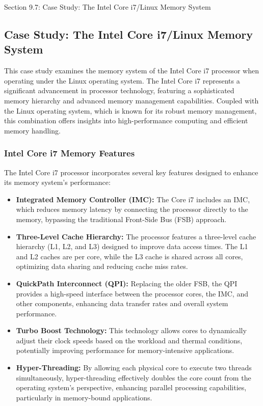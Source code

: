 \begin{notes}{Section 9.7: Case Study: The Intel Core i7/Linux Memory System}
    \subsection*{Case Study: The Intel Core i7/Linux Memory System}

    This case study examines the memory system of the Intel Core i7 processor when operating under the Linux operating system. The Intel Core i7 represents a significant advancement in processor 
    technology, featuring a sophisticated memory hierarchy and advanced memory management capabilities. Coupled with the Linux operating system, which is known for its robust memory management, this 
    combination offers insights into high-performance computing and efficient memory handling. \vspace*{1em}
    
    \subsubsection*{Intel Core i7 Memory Features}
    
    The Intel Core i7 processor incorporates several key features designed to enhance its memory system's performance:
    
    \begin{itemize}
        \item \textbf{Integrated Memory Controller (IMC):} The Core i7 includes an IMC, which reduces memory latency by connecting the processor directly to the memory, bypassing the traditional 
        Front-Side Bus (FSB) approach.
        \item \textbf{Three-Level Cache Hierarchy:} The processor features a three-level cache hierarchy (L1, L2, and L3) designed to improve data access times. The L1 and L2 caches are per core, 
        while the L3 cache is shared across all cores, optimizing data sharing and reducing cache miss rates.
        \item \textbf{QuickPath Interconnect (QPI):} Replacing the older FSB, the QPI provides a high-speed interface between the processor cores, the IMC, and other components, enhancing data transfer 
        rates and overall system performance.
        \item \textbf{Turbo Boost Technology:} This technology allows cores to dynamically adjust their clock speeds based on the workload and thermal conditions, potentially improving performance 
        for memory-intensive applications.
        \item \textbf{Hyper-Threading:} By allowing each physical core to execute two threads simultaneously, hyper-threading effectively doubles the core count from the operating system's perspective, 
        enhancing parallel processing capabilities, particularly in memory-bound applications.
    \end{itemize}
    

\end{notes}
